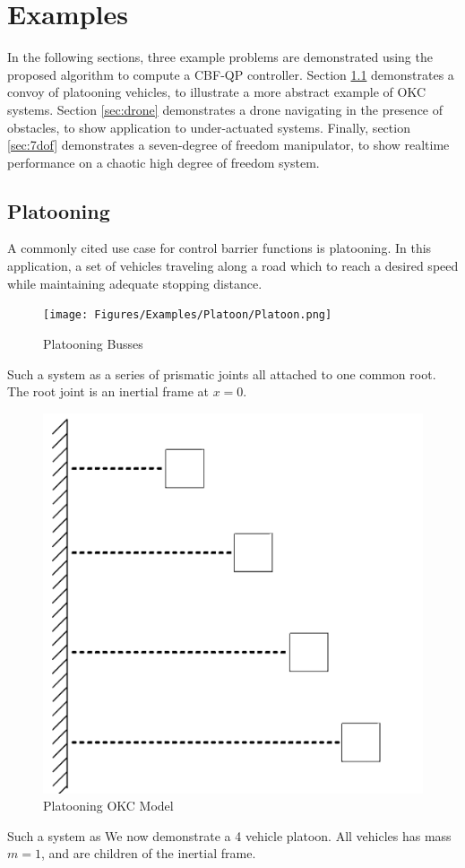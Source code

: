 \chapter{Examples}

In the following sections, three example problems are demonstrated using the proposed algorithm to compute a CBF-QP controller. Section \ref{sec:platooning} demonstrates a convoy of platooning vehicles, to illustrate a more abstract example of OKC systems. Section \ref{sec:drone} demonstrates a drone navigating in the presence of obstacles, to show application to under-actuated systems. Finally, section \ref{sec:7dof} demonstrates a seven-degree of freedom manipulator, to show realtime performance on a chaotic high degree of freedom system.



\section{Platooning} \label{sec:platooning}
\noindent A commonly cited use case for control barrier functions is platooning. In this application, a set of vehicles traveling along a road which to reach a desired speed while maintaining adequate stopping distance. 
\begin{figure}[H]
    \centering
    \texttt{[image: Figures/Examples/Platoon/Platoon.png]}
    \caption{Platooning Busses}
    \label{fig:platoon_diag}
\end{figure}
\noindent Such a system as a series of prismatic joints all attached to one common root. The root joint is an inertial frame at $x=0$.  

\begin{figure}[H]
    \centering
    \includegraphics[width=\textwidth]{Figures/Examples/Platoon/PlatoonNE.png}
    \caption{Platooning OKC Model}
    \label{fig:platoon_diag_2}
\end{figure}
\noindent Such a system as
\noindent We now demonstrate a 4 vehicle platoon. All vehicles has mass $m = 1$, and are children of the inertial frame. 
